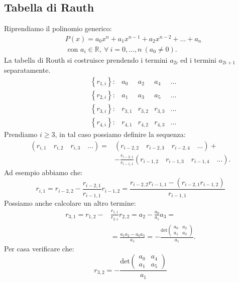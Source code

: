 \subsection{Tabella di Rauth}%
\label{sub:Tabella di Rauth}
Riprendiamo il polinomio generico:
\[\begin{aligned}
    &P(x) = a_0 x^{n}+ a_1x^{n-1} + a_2 x^{n-2}+ \ldots + a_{n} \\
    &\text{ con  } a_i \in \mathbb{R}, \ \forall  \ i = 0 , \ldots, n \ (a_0\neq 0)
.\end{aligned}\]
La tabella di Routh si costruisce prendendo i termini $a_{2i}$ ed i termini $a_{2i + 1}$ separatamente.
\[
    \begin{matrix}
	   & \left\{r_{1,i}\right\}: & a_0  & a_2  & a_4  &\ldots\\
	   & \left\{r_{2, i}\right\}:& a_1 & a_3  & a_5 & \ldots\\
	   & \left\{r_{3, i}\right\}: & r_{3, 1} & r_{3,2} & r_{3,3} & \ldots\\
	   & \left\{r_{4, i}\right\}: & r_{4, 1} & r_{4,2} & r_{4,3} & \ldots
    \end{matrix}
\] 
Prendiamo $i \ge 3$, in tal caso possiamo definire la sequenza:
\[\begin{aligned}
    \left(r_{i, 1} \quad r_{i, 2} \quad r_{i, 3} \quad \ldots\right) = &\left(r_{i-2, 2} \quad r_{i-2, 3} \quad r_{i-2, 4} \quad \ldots\right) + \\
    & - \frac{r_{i-2, 1}}{r_{i-1,1}}(r_{i-1,2} \quad r_{i-1,3} \quad r_{i-1,4} \quad \ldots)
.\end{aligned}\]
Ad esempio abbiamo che:
\[
    r_{i,1}= r_{i-2,2} - \frac{r_{i-2,1}}{r_{i-1,1}}r_{i-1,2} = 
    \frac{r_{i-2,2}r_{i-1,1}- (r_{i-2, 1}r_{i-1,2})}{r_{i-1,1}}
\] 
Possiamo anche calcolare un altro termine:
\[\begin{aligned}
     r_{3,1} = r_{1,2}- &\frac{r_{1,1}}{r_{2,1}}r_{2,2} = a_2 - \frac{a_0}{a_1} a_3 = \\
    &=\frac{ a_1a_2-a_0a_3}{a_1} = - \frac{\text{det}\begin{pmatrix} a_0 & a_2 \\ a_1 & a_3 \end{pmatrix} }{a_1}
.\end{aligned}\]
Per casa verificare che:
\[
    r_{3,2} = - \frac{\text{det}\begin{pmatrix} a_0 & a_4 \\ a_1 & a_5 \end{pmatrix} }{a_1}
\] 
